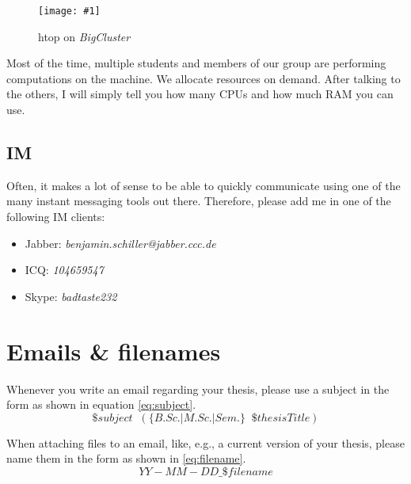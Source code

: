 \documentclass{article}
\newcommand{\img}[4]{
	\begin{figure}[!htb]
		\centering
		\texttt{[image: \#1]}
		\caption{#3}
		\label{#2}
	\end{figure}
}
\begin{document}
\img{bigcluster}{fig:bigcluster}{htop on \emph{BigCluster}}{0.6}

Most of the time, multiple students and members of our group are performing computations on the machine.
We allocate resources on demand.
After talking to the others, I will simply tell you how many CPUs and how much RAM you can use.







\subsection{IM}

Often, it makes a lot of sense to be able to quickly communicate using one of the many instant messaging tools out there.
Therefore, please add me in one of the following IM clients:
\begin{itemize}
	\item Jabber: \emph{benjamin.schiller@jabber.ccc.de}
	\item ICQ: \emph{104659547}
	\item Skype: \emph{badtaste232}
\end{itemize}













\section{Emails \& filenames}

Whenever you write an email regarding your thesis, please use a subject in the form as shown in equation \ref{eq:subject}.
\begin{equation} \label{eq:subject}
	\$subject \;\; (\{B.Sc. | M.Sc. | Sem.\} \;\; \$thesisTitle)
\end{equation}

When attaching files to an email, like, e.g., a current version of your thesis, please name them in the form as shown in \ref{eq:filename}.
\begin{equation} \label{eq:filename}
	YY\!\!-\!\!MM\!\!-\!\!DD\!\_\!\$filename
\end{equation}
\end{document}
